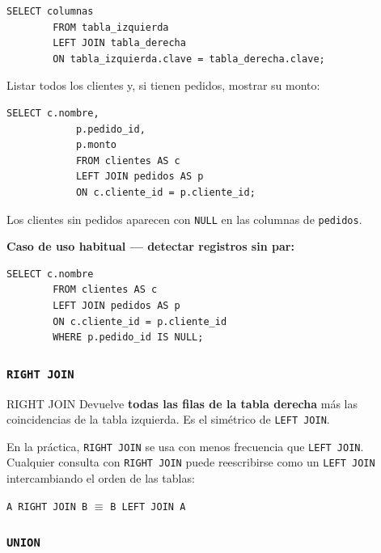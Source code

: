 \documentclass[12pt, a4paper]{article}
\begin{document}
	\begin{lstlisting}[style=sql, caption={Sintaxis de LEFT JOIN}]
		SELECT columnas
		FROM tabla_izquierda
		LEFT JOIN tabla_derecha
		ON tabla_izquierda.clave = tabla_derecha.clave;
	\end{lstlisting}
	
	\begin{ejemplo}
		Listar todos los clientes y, si tienen pedidos, mostrar su monto:
		
		\begin{lstlisting}[style=sql, caption={LEFT JOIN: todos los clientes con sus pedidos}]
			SELECT c.nombre,
			p.pedido_id,
			p.monto
			FROM clientes AS c
			LEFT JOIN pedidos AS p
			ON c.cliente_id = p.cliente_id;
		\end{lstlisting}
		
		Los clientes sin pedidos aparecen con \texttt{NULL} en las columnas de \texttt{pedidos}.
	\end{ejemplo}
	
	\textbf{Caso de uso habitual — detectar registros sin par:}
	
	\begin{lstlisting}[style=sql, caption={Clientes que nunca han realizado un pedido}]
		SELECT c.nombre
		FROM clientes AS c
		LEFT JOIN pedidos AS p
		ON c.cliente_id = p.cliente_id
		WHERE p.pedido_id IS NULL;
	\end{lstlisting}
	
	\subsubsection{\texttt{RIGHT JOIN}}
	
	\begin{definicion}{RIGHT JOIN}
		Devuelve \textbf{todas las filas de la tabla derecha} más las coincidencias de la tabla
		izquierda. Es el simétrico de \texttt{LEFT JOIN}.
	\end{definicion}
	
	\begin{nota}
		En la práctica, \texttt{RIGHT JOIN} se usa con menos frecuencia que \texttt{LEFT JOIN}.
		Cualquier consulta con \texttt{RIGHT JOIN} puede reescribirse como un \texttt{LEFT JOIN}
		intercambiando el orden de las tablas:
		\begin{center}
			\texttt{A RIGHT JOIN B} $\equiv$ \texttt{B LEFT JOIN A}
		\end{center}
	\end{nota}
	
	\subsubsection{\texttt{UNION}}
	
\end{document}
